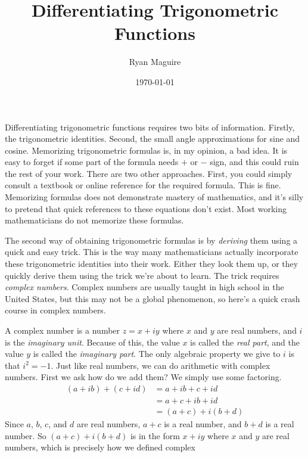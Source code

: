 \documentclass{article}
\title{Differentiating Trigonometric Functions}
\author{Ryan Maguire}
\date{\today}
\begin{document}
    \maketitle
    Differentiating trigonometric functions requires two bits of information.
    Firstly, the trigonometric identities. Second, the small angle
    approximations for sine and cosine. Memorizing trigonometric formulas is,
    in my opinion, a bad idea. It is easy to forget if some part of the formula
    needs $+$ or $-$ sign, and this could ruin the rest of your work. There are
    two other approaches. First, you could simply consult a textbook or online
    reference for the required formula. This is fine. Memorizing formulas does
    not demonstrate mastery of mathematics, and it's silly to pretend that
    quick references to these equations don't exist. Most working
    mathematicians do not memorize these formulas.
    \par\hfill\par
    The second way of obtaining trigonometric formulas is by \textit{deriving}
    them using a quick and easy trick. This is the way many mathematicians
    actually incorporate these trigonometric identities into their work. Either
    they look them up, or they quickly derive them using the trick we're about
    to learn. The trick requires \textit{complex numbers}. Complex numbers are
    usually taught in high school in the United States, but this may not be a
    global phenomenon, so here's a quick crash course in complex numbers.
    \par\hfill\par
    A complex number is a number $z=x+iy$ where $x$ and $y$ are real numbers,
    and $i$ is the \textit{imaginary unit}. Because of this, the value $x$ is
    called the \textit{real part}, and the value $y$ is called the
    \textit{imaginary part}. The only algebraic property we
    give to $i$ is that $i^{2}=-1$. Just like real numbers, we can do
    arithmetic with complex numbers. First we ask how do we add them? We simply
    use some factoring.
    \begin{align}
        (a+ib)+(c+id)
            &=a+ib+c+id\\
            &=a+c+ib+id\\
            &=(a+c)+i(b+d)
    \end{align}
    Since $a$, $b$, $c$, and $d$ are real numbers, $a+c$ is a real number, and
    $b+d$ is a real number. So $(a+c)+i(b+d)$ is in the form $x+iy$ where
    $x$ and $y$ are real numbers, which is precisely how we defined complex
\end{document}
